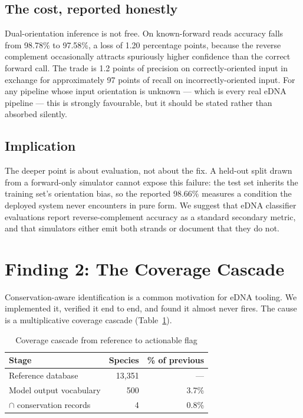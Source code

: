 \documentclass[conference]{IEEEtran}
\begin{document}
\subsection{The cost, reported honestly}
Dual-orientation inference is not free. On known-forward reads accuracy
falls from 98.78\% to 97.58\%, a loss of 1.20 percentage points, because
the reverse complement occasionally attracts spuriously higher confidence
than the correct forward call. The trade is 1.2 points of precision on
correctly-oriented input in exchange for approximately 97 points of recall
on incorrectly-oriented input. For any pipeline whose input orientation is
unknown --- which is every real eDNA pipeline --- this is strongly
favourable, but it should be stated rather than absorbed silently.

\subsection{Implication}
The deeper point is about evaluation, not about the fix. A held-out split
drawn from a forward-only simulator cannot expose this failure: the test set
inherits the training set's orientation bias, so the reported 98.66\%
measures a condition the deployed system never encounters in pure form. We
suggest that eDNA classifier evaluations report reverse-complement accuracy
as a standard secondary metric, and that simulators either emit both
strands or document that they do not.

\section{Finding 2: The Coverage Cascade}
\label{sec:coverage}

Conservation-aware identification is a common motivation for eDNA tooling.
We implemented it, verified it end to end, and found it almost never fires.
The cause is a multiplicative coverage cascade
(Table~\ref{tab:coverage}).

\begin{table}[t]
\caption{Coverage cascade from reference to actionable flag}
\label{tab:coverage}
\centering
\begin{tabular}{lrr}
\toprule
Stage & Species & \% of previous \\
\midrule
Reference database          & 13{,}351 & --- \\
Model output vocabulary     & 500      & 3.7\% \\
$\cap$ conservation records & 4        & 0.8\% \\
\bottomrule
\end{tabular}
\end{table}
\end{document}
